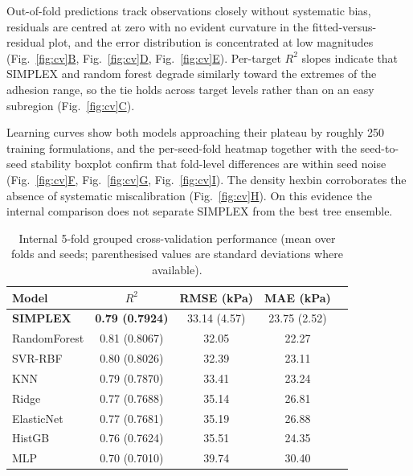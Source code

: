 \documentclass[utf8]{FrontiersinHarvard}
\newcommand{\Fref}[2]{Fig.~\hyperref[#1]{\ref{#1}#2}}
\begin{document}
Out-of-fold predictions track observations closely without systematic bias, residuals are centred at zero with no evident curvature in the fitted-versus-residual plot, and the error distribution is concentrated at low magnitudes (\Fref{fig:cv}{B}, \Fref{fig:cv}{D}, \Fref{fig:cv}{E}). Per-target $R^2$ slopes indicate that SIMPLEX and random forest degrade similarly toward the extremes of the adhesion range, so the tie holds across target levels rather than on an easy subregion (\Fref{fig:cv}{C}).

Learning curves show both models approaching their plateau by roughly 250 training formulations, and the per-seed-fold heatmap together with the seed-to-seed stability boxplot confirm that fold-level differences are within seed noise (\Fref{fig:cv}{F}, \Fref{fig:cv}{G}, \Fref{fig:cv}{I}). The density hexbin corroborates the absence of systematic miscalibration (\Fref{fig:cv}{H}). On this evidence the internal comparison does not separate SIMPLEX from the best tree ensemble.

\begin{table}[h]
\centering
\caption{Internal 5-fold grouped cross-validation performance (mean over folds and seeds; parenthesised values are standard deviations where available).}
\label{tab:int}
\begin{tabular}{lcccc}
\toprule
Model & $R^2$ & RMSE (kPa) & MAE (kPa) \\
\midrule
\textbf{SIMPLEX} & \textbf{0.79 (0.7924)} & 33.14 (4.57) & 23.75 (2.52) \\
RandomForest & 0.81 (0.8067) & 32.05 & 22.27 \\
SVR-RBF & 0.80 (0.8026) & 32.39 & 23.11 \\
KNN & 0.79 (0.7870) & 33.41 & 23.24 \\
Ridge & 0.77 (0.7688) & 35.14 & 26.81 \\
ElasticNet & 0.77 (0.7681) & 35.19 & 26.88 \\
HistGB & 0.76 (0.7624) & 35.51 & 24.35 \\
MLP & 0.70 (0.7010) & 39.74 & 30.40 \\
\bottomrule
\end{tabular}
\end{table}
\end{document}
